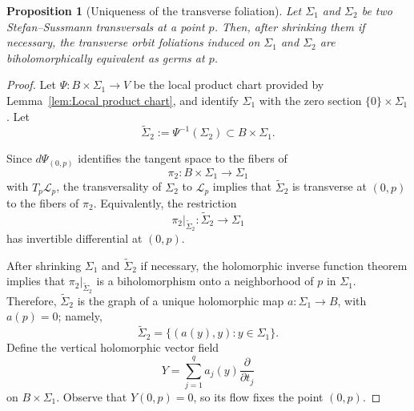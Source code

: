 \documentclass[10pt,a4paper]{amsart}
\newtheorem{proposition}{Proposition}
\newcommand{\leaf}[1]{\mathcal{L}_{#1}}
\begin{document}
\begin{proposition}[Uniqueness of the transverse foliation]\label{Uniqueness transverse foliation}
	Let $\Sigma_1$ and $\Sigma_2$ be two Stefan--Sussmann transversals at a point $p$.
	Then, after shrinking them if necessary, the transverse orbit foliations induced on $\Sigma_1$ and $\Sigma_2$ are biholomorphically equivalent as germs at $p$.
\end{proposition}

\begin{proof}
	Let $\Psi:B\times\Sigma_1\longrightarrow V$ be the local product chart provided by Lemma~\ref{lem:Local product chart}, and identify $\Sigma_1$ with the zero section $\{0\}\times\Sigma_1$.
	Let
	$$
		\widetilde{\Sigma}_2:=\Psi^{-1}(\Sigma_2)\subset B\times\Sigma_1.
	$$

	Since $d\Psi_{(0,p)}$ identifies the tangent space to the fibers of 
	\[
		\pi_2:B\times\Sigma_1\longrightarrow\Sigma_1
	\]
	with $T_p\leaf{p} $, the transversality of $\Sigma_2$ to $\leaf{p}$ implies that $\widetilde{\Sigma}_2$ is transverse at $(0,p)$ to the fibers of $\pi_2$.
	Equivalently, the restriction 
	\[
		\pi_2|_{\widetilde{\Sigma}_2}: \widetilde{\Sigma}_2 \longrightarrow \Sigma_1
	\]
	has invertible differential at $(0,p)$.

	After shrinking $\Sigma_1$ and $\widetilde{\Sigma}_2$ if necessary, the holomorphic inverse function theorem implies that $\pi_2|_{\widetilde{\Sigma}_2}$ is a biholomorphism onto a neighborhood of $p$ in $\Sigma_1$.
	Therefore, $\widetilde{\Sigma}_2$ is the graph of a unique holomorphic map $a:\Sigma_1\longrightarrow B$, with $a(p)=0$; namely,
	\[
		\widetilde{\Sigma}_2 = \{(a(y),y):y\in\Sigma_1\}.
	\]
	Define the vertical holomorphic vector field 
	\[
		Y = \sum_{j=1}^q a_j(y)\frac{\partial}{\partial t_j}
	\]
	on $B\times\Sigma_1$.
	Observe that $Y(0,p)=0$, so its flow fixes the point $(0,p)$.


\end{proof}
\end{document}
